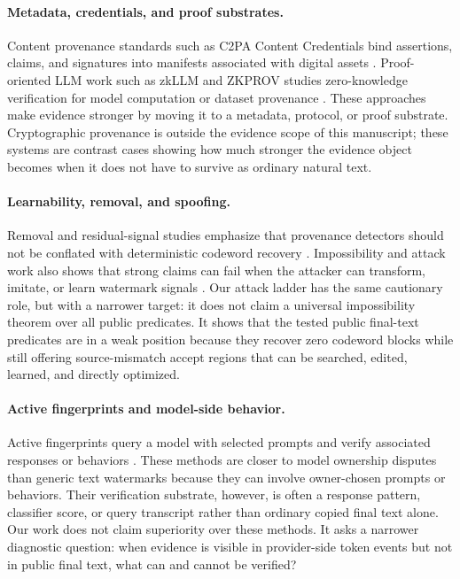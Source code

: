 \paragraph{Metadata, credentials, and proof substrates.}
Content provenance standards such as C2PA Content Credentials bind assertions,
claims, and signatures into manifests associated with digital assets
\cite{c2pa2025spec}.  Proof-oriented LLM work such as zkLLM and ZKPROV studies
zero-knowledge verification for model computation or dataset provenance
\cite{sun2024zkllm,namazi2025zkprov}.  These approaches make evidence stronger
by moving it to a metadata, protocol, or proof substrate.  Cryptographic
provenance is outside the evidence scope of this manuscript; these systems are
contrast cases showing how much stronger the evidence object becomes when it
does not have to survive as ordinary natural text.

\paragraph{Learnability, removal, and spoofing.}
Removal and residual-signal studies emphasize that provenance detectors should
not be conflated with deterministic codeword recovery
\cite{chen2025demark,sander2024radioactive}.  Impossibility and attack work
also shows that strong claims can fail when the attacker can transform,
imitate, or learn watermark signals
\cite{zhang2023watermarkssand,gu2023learnability,an2025ditto}.  Our attack
ladder has the same cautionary role, but with a narrower target: it does not
claim a universal impossibility theorem over all public predicates.  It shows
that the tested public final-text predicates are in a weak position because
they recover zero codeword blocks while still offering source-mismatch accept
regions that can be searched, edited, learned, and directly optimized.

\paragraph{Active fingerprints and model-side behavior.}
Active fingerprints query a model with selected prompts and verify associated
responses or behaviors
\cite{xu2024instructional,zeng2024huref,russinovich2024chainhash,pasquini2025llmmap,yang2024fingerprint,yamabe2025mergeprint,xu2025ctcc,xu2025evertracer,bai2025esf,hu2025resf,nasery2025scalable,tsai2025rofl}.
These methods are closer to model ownership disputes than generic text
watermarks because they can involve owner-chosen prompts or behaviors.  Their
verification substrate, however, is often a response pattern, classifier score,
or query transcript rather than ordinary copied final text alone.  Our work
does not claim superiority over these methods.  It asks a narrower diagnostic
question: when evidence is visible in provider-side token events but not in
public final text, what can and cannot be verified?

